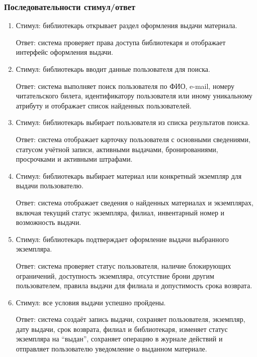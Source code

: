 \documentclass[12pt,a4paper]{article}
\begin{document}
	\subsubsection{Последовательности стимул/ответ}
	
	\begin{enumerate}
		\item Стимул: библиотекарь открывает раздел оформления выдачи материала.
		
		Ответ: система проверяет права доступа библиотекаря и отображает интерфейс
		оформления выдачи.
		
		\item Стимул: библиотекарь вводит данные пользователя для поиска.
		
		Ответ: система выполняет поиск пользователя по ФИО, e-mail, номеру
		читательского билета, идентификатору пользователя или иному уникальному
		атрибуту и отображает список найденных пользователей.
		
		\item Стимул: библиотекарь выбирает пользователя из списка результатов поиска.
		
		Ответ: система отображает карточку пользователя с основными сведениями,
		статусом учётной записи, активными выдачами, бронированиями, просрочками
		и активными штрафами.
		
		\item Стимул: библиотекарь выбирает материал или конкретный экземпляр для
		выдачи пользователю.
		
		Ответ: система отображает сведения о найденных материалах и экземплярах,
		включая текущий статус экземпляра, филиал, инвентарный номер и возможность
		выдачи.
		
		\item Стимул: библиотекарь подтверждает оформление выдачи выбранного экземпляра.
		
		Ответ: система проверяет статус пользователя, наличие блокирующих ограничений,
		доступность экземпляра, отсутствие брони другим пользователем, правила выдачи
		для филиала и допустимость срока возврата.
		
		\item Стимул: все условия выдачи успешно пройдены.
		
		Ответ: система создаёт запись выдачи, сохраняет пользователя, экземпляр,
		дату выдачи, срок возврата, филиал и библиотекаря, изменяет статус экземпляра
		на ``выдан'', сохраняет операцию в журнале действий и отправляет пользователю
		уведомление о выданном материале.
		

\end{enumerate}
\end{document}
